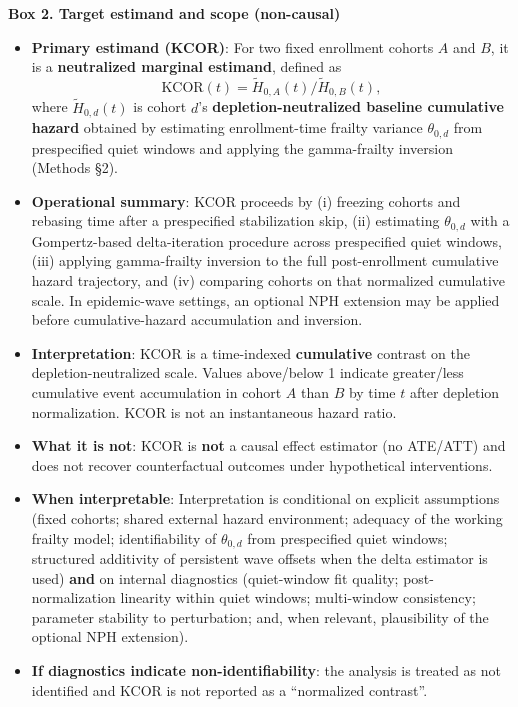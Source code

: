 \documentclass[
]{article}
\providecommand{\tightlist}{%
  \setlength{\itemsep}{0pt}\setlength{\parskip}{0pt}}
\renewenvironment{quote}{\begin{mdframed}[style=kcorquote]}{\end{mdframed}}
\begin{document}
\begin{quote}
\textbf{Box 2. Target estimand and scope (non-causal)}

\begin{itemize}
\tightlist
\item
  \textbf{Primary estimand (KCOR)}: For two fixed enrollment cohorts
  \(A\) and \(B\), it is a \textbf{neutralized marginal estimand},
  defined as \[
  \mathrm{KCOR}(t)=\tilde H_{0,A}(t)/\tilde H_{0,B}(t),
  \] where \(\tilde H_{0,d}(t)\) is cohort \(d\)'s
  \textbf{depletion-neutralized baseline cumulative hazard} obtained by
  estimating enrollment-time frailty variance \(\theta_{0,d}\) from
  prespecified quiet windows and applying the gamma-frailty inversion
  (Methods §2).
\item
  \textbf{Operational summary}: KCOR proceeds by (i) freezing cohorts
  and rebasing time after a prespecified stabilization skip, (ii)
  estimating \(\theta_{0,d}\) with a Gompertz-based delta-iteration
  procedure across prespecified quiet windows, (iii) applying
  gamma-frailty inversion to the full post-enrollment cumulative hazard
  trajectory, and (iv) comparing cohorts on that normalized cumulative
  scale. In epidemic-wave settings, an optional NPH extension may be
  applied before cumulative-hazard accumulation and inversion.
\item
  \textbf{Interpretation}: KCOR is a time-indexed \textbf{cumulative}
  contrast on the depletion-neutralized scale. Values above/below 1
  indicate greater/less cumulative event accumulation in cohort \(A\)
  than \(B\) by time \(t\) after depletion normalization. KCOR is not an
  instantaneous hazard ratio.
\item
  \textbf{What it is not}: KCOR is \textbf{not} a causal effect
  estimator (no ATE/ATT) and does not recover counterfactual outcomes
  under hypothetical interventions.
\item
  \textbf{When interpretable}: Interpretation is conditional on explicit
  assumptions (fixed cohorts; shared external hazard environment;
  adequacy of the working frailty model; identifiability of
  \(\theta_{0,d}\) from prespecified quiet windows; structured
  additivity of persistent wave offsets when the delta estimator is
  used) \textbf{and} on internal diagnostics (quiet-window fit quality;
  post-normalization linearity within quiet windows; multi-window
  consistency; parameter stability to perturbation; and, when relevant,
  plausibility of the optional NPH extension).
\item
  \textbf{If diagnostics indicate non-identifiability}: the analysis is
  treated as not identified and KCOR is not reported as a ``normalized
  contrast''.
\end{itemize}
\end{quote}
\end{document}
